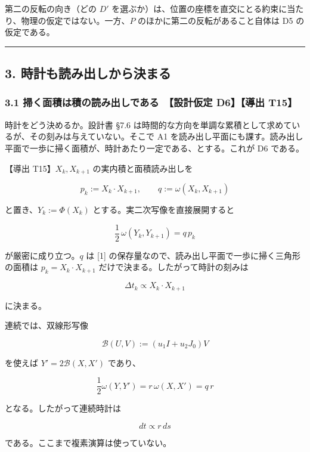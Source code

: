 \documentclass[
  a4paper,
]{ltjsarticle}
\begin{document}
第二の反転の向き（どの \(D'\)
を選ぶか）は、位置の座標を直交にとる約束に当たり、物理の仮定ではない。一方、\(P\)
のほかに第二の反転があること自体は D5 の仮定である。

\begin{center}\rule{0.5\linewidth}{0.5pt}\end{center}

\subsection{3.
時計も読み出しから決まる}\label{ux6642ux8a08ux3082ux8aadux307fux51faux3057ux304bux3089ux6c7aux307eux308b}

\subsubsection{3.1 掃く面積は積の読み出しである　【設計仮定 D6】【導出
T15】}\label{ux6383ux304fux9762ux7a4dux306fux7a4dux306eux8aadux307fux51faux3057ux3067ux3042ux308b-ux8a2dux8a08ux4eeeux5b9a-d6ux5c0eux51fa-t15}

時計をどう決めるか。設計書 §7.6
は時間的な方向を単調な累積として求めているが、その刻みは与えていない。そこで
A1
を読み出し平面にも課す。読み出し平面で一歩に掃く面積が、時計あたり一定である、とする。これが
D6 である。

【導出 T15】\(X_k,X_{k+1}\) の実内積と面積読み出しを

\[
p_k:=X_k\cdot X_{k+1},\qquad q:=\omega(X_k,X_{k+1})
\]

と置き、\(Y_k:=\Phi(X_k)\) とする。実二次写像を直接展開すると

\[
\boxed{\;\frac12\,\omega(Y_k,Y_{k+1})=q\,p_k\;}
\]

が厳密に成り立つ。\(q\) は {[}1{]}
の保存量なので、読み出し平面で一歩に掃く三角形の面積は
\(p_k=X_k\cdot X_{k+1}\) だけで決まる。したがって時計の刻みは

\[
\boxed{\;\Delta t_k\propto X_k\cdot X_{k+1}\;}
\]

に決まる。

連続では、双線形写像

\[
\mathcal B(U,V):=(u_1I+u_2J_0)V
\]

を使えば \(Y'=2\mathcal B(X,X')\) であり、

\[
\boxed{\;\frac12\omega(Y,Y')=r\,\omega(X,X')=q\,r\;}
\]

となる。したがって連続時計は

\[
\boxed{\;dt\propto r\,ds\;}
\]

である。ここまで複素演算は使っていない。
\end{document}
